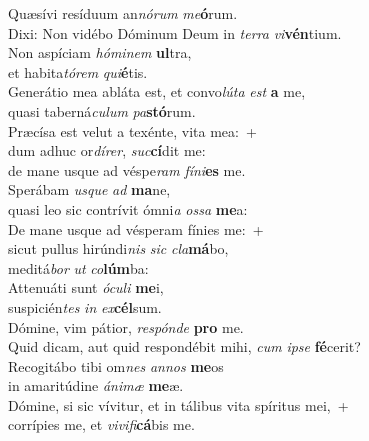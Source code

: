 \evenverse Quæsívi resíduum an\textit{nó}\textit{rum} \textit{me}\textbf{ó}rum.~\*\\
\evenverse Dixi: Non vidébo Dóminum Deum in \textit{ter}\textit{ra} \textit{vi}\textbf{vén}tium.\\
\oddverse Non aspíciam \textit{hó}\textit{mi}\textit{nem} \textbf{ul}tra,~\*\\
\oddverse et habita\textit{tó}\textit{rem} \textit{qui}\textbf{é}tis.\\
\evenverse Generátio mea abláta est, et convo\textit{lú}\textit{ta} \textit{est} \textbf{a} me,~\*\\
\evenverse quasi taberná\textit{cu}\textit{lum} \textit{pa}\textbf{stó}rum.\\
\oddverse Præcísa est velut a texénte, vita mea:~+\\
\oddverse  dum adhuc or\textit{dí}\textit{rer}, \textit{suc}\textbf{cí}dit me:~\*\\
\oddverse de mane usque ad véspe\textit{ram} \textit{fí}\textit{ni}\textbf{es} me.\\
\evenverse Sperábam \textit{us}\textit{que} \textit{ad} \textbf{ma}ne,~\*\\
\evenverse quasi leo sic contrívit ómni\textit{a} \textit{os}\textit{sa} \textbf{me}a:\\
\oddverse De mane usque ad vésperam fínies me:~+\\
\oddverse  sicut pullus hirúndi\textit{nis} \textit{sic} \textit{cla}\textbf{má}bo,~\*\\
\oddverse meditá\textit{bor} \textit{ut} \textit{co}\textbf{lúm}ba:\\
\evenverse Attenuáti sunt \textit{ó}\textit{cu}\textit{li} \textbf{me}i,~\*\\
\evenverse suspicién\textit{tes} \textit{in} \textit{ex}\textbf{cél}sum.\\
\oddverse Dómine, vim pátior, \textit{re}\textit{spón}\textit{de} \textbf{pro} me.~\*\\
\oddverse Quid dicam, aut quid respondébit mihi, \textit{cum} \textit{i}\textit{pse} \textbf{fé}cerit?\\
\evenverse Recogitábo tibi om\textit{nes} \textit{an}\textit{nos} \textbf{me}os~\*\\
\evenverse in amaritúdine \textit{á}\textit{ni}\textit{mæ} \textbf{me}æ.\\
\oddverse Dómine, si sic vívitur, et in tálibus vita spíritus mei,~+\\
\oddverse  corrípies me, et \textit{vi}\textit{vi}\textit{fi}\textbf{cá}bis me.~\*\\
